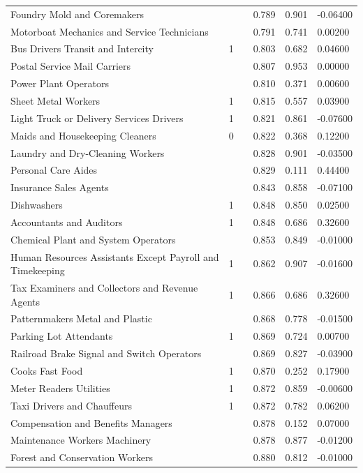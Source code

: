 \documentclass[11pt]{report}
\numberwithin{equation}{chapter}
\begin{document}
\begin{spacing}{2}
\begin{longtable}{ p{} p{} p{}  p{}  p{}  p{} }
Foundry Mold and Coremakers	&		&	&	0.789	&	0.901	&	-0.06400	\\
Motorboat Mechanics and Service Technicians	&		&	&	0.791	&	0.741	&	0.00200	\\
Bus Drivers Transit and Intercity	&	1	&	&	0.803	&	0.682	&	0.04600	\\
Postal Service Mail Carriers	&		&	&	0.807	&	0.953	&	0.00000	\\
Power Plant Operators	&		&	&	0.810	&	0.371	&	0.00600	\\
Sheet Metal Workers	&	1	&	&	0.815	&	0.557	&	0.03900	\\
Light Truck or Delivery Services Drivers	&	1	&	&	0.821	&	0.861	&	-0.07600	\\
Maids and Housekeeping Cleaners	&	0	&	&	0.822	&	0.368	&	0.12200	\\
Laundry and Dry-Cleaning Workers	&		&	&	0.828	&	0.901	&	-0.03500	\\
Personal Care Aides	&		&	&	0.829	&	0.111	&	0.44400	\\
Insurance Sales Agents	&		&	&	0.843	&	0.858	&	-0.07100	\\
Dishwashers	&	1	&	&	0.848	&	0.850	&	0.02500	\\
Accountants and Auditors	&	1	&	&	0.848	&	0.686	&	0.32600	\\
Chemical Plant and System Operators	&		&	&	0.853	&	0.849	&	-0.01000	\\
Human Resources Assistants Except Payroll and Timekeeping	&	1	&	&	0.862	&	0.907	&	-0.01600	\\
Tax Examiners and Collectors and Revenue Agents	&	1	&	&	0.866	&	0.686	&	0.32600	\\
Patternmakers Metal and Plastic	&		&	&	0.868	&	0.778	&	-0.01500	\\
Parking Lot Attendants	&	1	&	&	0.869	&	0.724	&	0.00700	\\
Railroad Brake Signal and Switch Operators	&		&	&	0.869	&	0.827	&	-0.03900	\\
Cooks Fast Food	&	1	&	&	0.870	&	0.252	&	0.17900	\\
Meter Readers Utilities	&	1	&	&	0.872	&	0.859	&	-0.00600	\\
Taxi Drivers and Chauffeurs	&	1	&	&	0.872	&	0.782	&	0.06200	\\
Compensation and Benefits Managers	&		&	&	0.878	&	0.152	&	0.07000	\\
Maintenance Workers Machinery	&		&	&	0.878	&	0.877	&	-0.01200	\\
Forest and Conservation Workers	&		&	&	0.880	&	0.812	&	-0.01000	\\

\end{longtable}
\end{spacing}
\end{document}
